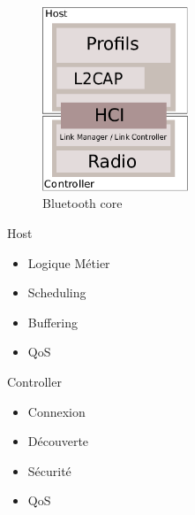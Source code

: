 \begin{frame}

\begin{minipage}[t]{0.45\linewidth}

\begin{figure}
\vspace{0.5cm}
\includegraphics[height=5.5cm]{arch_core.png}
\caption{Bluetooth core}
\end{figure}

\end{minipage}
\begin{minipage}[t]{0.52\linewidth}
\begin{block}{Host}
\begin{itemize}
	\item Logique Métier
	\item Scheduling
	\item Buffering
	\item QoS
\end{itemize}
\end{block}

\begin{block}{Controller}
\begin{itemize}
	\item Connexion
	\item Découverte
	\item Sécurité
	\item QoS
\end{itemize}
\end{block}


\end{minipage}
\end{frame}

